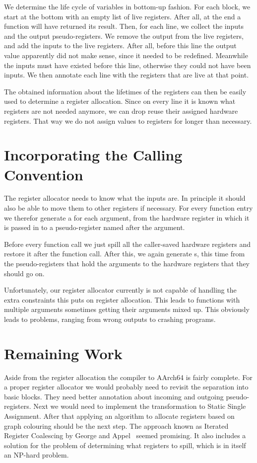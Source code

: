 We determine the life cycle of variables in bottom-up fashion.
For each block, we start at the bottom with an empty list of live registers.
After all, at the end a function will have returned its result.
Then, for each line, we collect the inputs and the output pseudo-registers.
We remove the output from the live registers, and add the inputs to the live registers.
After all, before this line the output value apparently did not make sense, since it needed to be redefined.
Meanwhile the inputs must have existed before this line, otherwise they could not have been inputs.
We then annotate each line with the registers that are live at that point.

The obtained information about the lifetimes of the registers can then be easily used to determine a register allocation.
Since on every line it is known what registers are not needed anymore, we can drop reuse their assigned hardware registers.
That way we do not assign values to registers for longer than necessary.

\section{Incorporating the Calling Convention}

The register allocator needs to know what the inputs are.
In principle it should also be able to move them to other registers if necessary.
For every function entry we therefor generate a  for each argument, from the hardware register in which it is passed in to a pseudo-register named after the argument.

Before every function call we just spill all the caller-saved hardware registers and restore it after the function call.
After this, we again generate s, this time from the pseudo-registers that hold the arguments to the hardware registers that they should go on.

Unfortunately, our register allocator currently is not capable of handling the extra constraints this puts on register allocation.
This leads to functions with multiple arguments sometimes getting their arguments mixed up.
This obviously leads to problems, ranging from wrong outputs to crashing programs.

\section{Remaining Work}

Aside from the register allocation the compiler to AArch64 is fairly complete.
For a proper register allocator we would probably need to revisit the separation into basic blocks.
They need better annotation about incoming and outgoing pseudo-registers.
Next we would need to implement the transformation to Static Single Assignment.
After that applying an algorithm to allocate registers based on graph colouring should be the next step.
The approach known as Iterated Register Coalescing by George and Appel~\cite{IRC} seemed promising.
It also includes a solution for the problem of determining what registers to spill, which is in itself an NP-hard problem.

